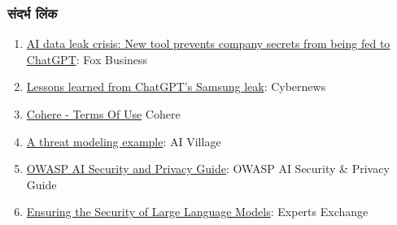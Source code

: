 \documentclass[
]{article}
\providecommand{\tightlist}{%
  \setlength{\itemsep}{0pt}\setlength{\parskip}{0pt}}
\begin{document}
\subsubsection{संदर्भ लिंक}\label{ux938ux926ux930ux92d-ux932ux915}

\begin{enumerate}
\def\labelenumi{\arabic{enumi}.}
\tightlist
\item
  \href{https://www.foxbusiness.com/politics/ai-data-leak-crisis-prevent-company-secrets-chatgpt}{AI
  data leak crisis: New tool prevents company secrets from being fed to
  ChatGPT}: Fox Business
\item
  \href{https://cybernews.com/security/chatgpt-samsung-leak-explained-lessons/}{Lessons
  learned from ChatGPT's Samsung leak}: Cybernews
\item
  \href{https://cohere.com/terms-of-use}{Cohere - Terms Of Use} Cohere
\item
  \href{https://aivillage.org/large\%20language\%20models/threat-modeling-llm/}{A
  threat modeling example}: AI Village
\item
  \href{https://owasp.org/www-project-ai-security-and-privacy-guide/}{OWASP
  AI Security and Privacy Guide}: OWASP AI Security \& Privacy Guide
\item
  \href{https://www.experts-exchange.com/articles/38220/Ensuring-the-Security-of-Large-Language-Models-Strategies-and-Best-Practices.html}{Ensuring
  the Security of Large Language Models}: Experts Exchange
\end{enumerate}
\end{document}
